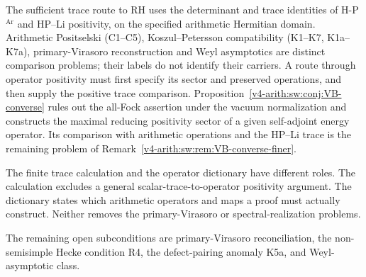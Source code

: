 The sufficient trace route to RH uses the determinant and trace
identities of H-P\(^{\mathrm{Ar}}\) and HP--Li positivity, on the
specified arithmetic Hermitian domain. Arithmetic Positselski
(C1--C5), Koszul--Petersson compatibility (K1--K7, K1a--K7a),
primary-Virasoro reconstruction and Weyl asymptotics are distinct
comparison problems; their labels do not identify their carriers.
A route through operator positivity must first specify its sector and
preserved operations, and then supply the positive trace comparison.
Proposition~\ref{v4-arith:sw:conj:VB-converse} rules out the all-Fock assertion
under the vacuum normalization and constructs the maximal reducing
positivity sector of a given self-adjoint energy operator. Its
comparison with arithmetic operations and the HP--Li trace is the
remaining problem of Remark~\ref{v4-arith:sw:rem:VB-converse-finer}.

The finite trace calculation and the operator dictionary have different
roles. The calculation excludes a general scalar-trace-to-operator
positivity argument. The dictionary states which arithmetic operators
and maps a proof must actually construct. Neither removes the
primary-Virasoro or spectral-realization problems.

The remaining open subconditions are primary-Virasoro reconciliation,
the non-semisimple Hecke condition R4, the defect-pairing anomaly
K5a, and Weyl-asymptotic class.
